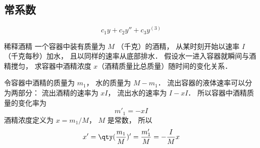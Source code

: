 
\subsection{常系数}
\begin{equation}
c_1 y + c_2 y'' + c_3 y^{(3)}
\end{equation}


\begin{example}{稀释酒精}
一个容器中装有质量为 $M$ （千克）的酒精， 从某时刻开始以速率 $I$ （千克每秒）加水， 且以同样的速率从底部排水． 假设水一进入容器就瞬间与酒精搅匀， 求容器中酒精浓度 $x$（酒精质量比总质量）随时间的变化关系．

令容器中酒精的质量为 $m_1$， 水的质量为 $M - m_1$． 流出容器的液体速率可以分为两部分： 流出酒精的速率为 $xI$， 流出水的速率为 $I - xI$． 所以容器中酒精质量的变化率为
\begin{equation}
m'_1 = -xI
\end{equation}
酒精浓度定义为 $x = m_1/M$， $M$ 是常数， 所以
\begin{equation}
x' = \qty(\frac{m_1}{M})' = \frac{m'_1}{M} = -\frac{I}{M}x
\end{equation}
\end{example}